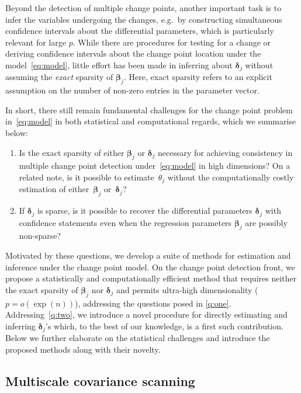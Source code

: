 \documentclass[11pt, a4paper]{article}
\newcommand{\cp}{\theta}
\theoremstyle{definition}
\theoremstyle{definition}
\theoremstyle{definition}
\theoremstyle{definition}
\theoremstyle{definition}
\theoremstyle{remark}
\theoremstyle{definition}
\theoremstyle{definition}
\theoremstyle{definition}
\begin{document}
Beyond the detection of multiple change points, another important task is to infer the variables undergoing the changes, e.g.\ by constructing simultaneous confidence intervals about the differential parameters, which is particularly relevant for large $p$.
While there are procedures for testing for a change \citep{wang2022optimal, liu2024simultaneous} or deriving confidence intervals about the change point location \citep{xu2022change} under the model~\eqref{eq:model}, little effort has been made in inferring about $\bm\delta_j$ without assuming the \emph{exact} sparsity of $\bm\beta_j$. {Here, exact sparsity refers to an explicit assumption on the number of non-zero entries in the parameter vector. }

In short, there still remain fundamental challenges for the change point problem in~\eqref{eq:model} in both statistical and computational regards, which we summarise below:
\begin{enumerate}[label = (C\arabic*)]
	\item \label{q:one}
	Is the {exact} sparsity of either $\bm{\beta}_j$ or $\bm\delta_j$ necessary for achieving consistency in multiple change point detection under~\eqref{eq:model} in high dimensions? 	On a related note, is it possible to estimate~$\cp_j$ without the computationally costly estimation of either~$\bm{\beta}_j$ or~$\bm\delta_j$?
	\item \label{q:two} If $\bm\delta_j$ is sparse, is it possible to recover the differential parameters $\bm\delta_j$ with confidence statements even when the regression parameters $\bm{\beta}_j$ are possibly non-sparse?
\end{enumerate}

Motivated by these questions, we develop a suite of methods for estimation and inference under the change point model. 
On the change point detection front, we propose a statistically and computationally efficient method that requires neither the exact sparsity of $\bm\beta_j$ nor $\bm\delta_j$ and permits ultra-high dimensionality ($p = o(\exp(n))$), addressing the questions posed in \ref{q:one}. 
Addressing~\ref{q:two}, we introduce a novel procedure for directly estimating and inferring $\bm\delta_j$'s which, to the best of our knowledge, is a first such contribution. 
Below we further elaborate on the statistical challenges and introduce the proposed methods along with their novelty.

\subsection{Multiscale covariance scanning}
\label{sec:size:change}
\end{document}
